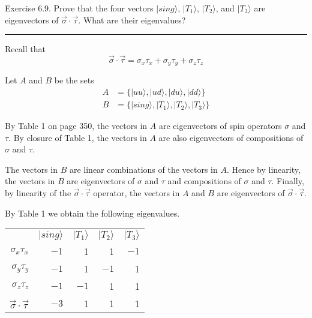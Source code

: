 \documentclass[12pt]{article}
\begin{document}
Exercise 6.9.
Prove that the four vectors $|sing\rangle$, $|T_1\rangle$,
$|T_2\rangle$, and $|T_3\rangle$ are eigenvectors of
$\vec\sigma\cdot\vec\tau$.
What are their eigenvalues?

\bigskip
\hrule

\bigskip
Recall that
\begin{equation*}
\vec\sigma\cdot\vec\tau=\sigma_x\tau_x+\sigma_y\tau_y+\sigma_z\tau_z
\end{equation*}

Let $A$ and $B$ be the sets
\begin{align*}
A&=\{|uu\rangle, |ud\rangle, |du\rangle, |dd\rangle\}
\\
B&=\{|sing\rangle, |T_1\rangle, |T_2\rangle, |T_3\rangle\}
\end{align*}

By Table 1 on page 350, the vectors in $A$ are eigenvectors of spin operators $\sigma$ and $\tau$.
By closure of Table 1, the vectors in $A$ are also eigenvectors of compositions of $\sigma$ and $\tau$.

\bigskip
The vectors in $B$ are linear combinations of the vectors in $A$.
Hence by linearity, the vectors in $B$ are eigenvectors of
$\sigma$ and $\tau$ and compositions of $\sigma$ and $\tau$.
Finally, by linearity of the $\vec\sigma\cdot\vec\tau$ operator,
the vectors in $A$ and $B$ are eigenvectors of $\vec\sigma\cdot\vec\tau$.

\bigskip
By Table 1 we obtain the following eigenvalues.
\begin{center}
\begin{tabular}{rrrrr}
& $|sing\rangle$ & $|T_1\rangle$ & $|T_2\rangle$ & $|T_3\rangle$
\\[1ex]
$\sigma_x\tau_x$ & $-1$ & 1 & 1 & $-1$
\\
$\sigma_y\tau_y$ & $-1$ & 1 & $-1$ & 1
\\
$\sigma_z\tau_z$ & $-1$ & $-1$ & 1 & 1
\\[1ex]
$\vec\sigma\cdot\vec\tau$ & $-3$ & 1 & 1 & 1
\end{tabular}
\end{center}
\end{document}
